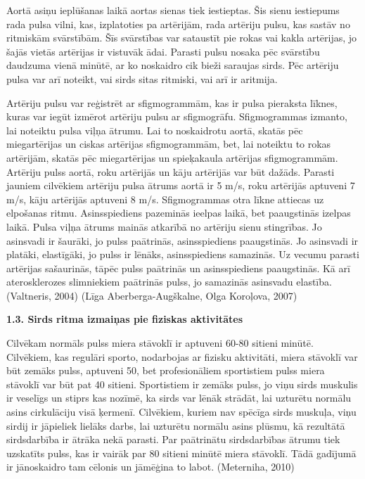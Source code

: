 \documentclass[12pt]{article}
\begin{document}
Aortā asiņu ieplūšanas laikā aortas sienas tiek iestieptas. Šis sienu iestiepums rada pulsa vilni, kas, izplatoties pa artērijām, rada artēriju pulsu, kas sastāv no ritmiskām svārstībām. Šīs svārstības var sataustīt pie rokas vai kakla artērijas, jo šajās vietās artērijas ir vistuvāk ādai. Parasti pulsu nosaka pēc svārstību daudzuma vienā minūtē, ar ko noskaidro cik bieži saraujas sirds. Pēc artēriju pulsa var arī noteikt, vai sirds sitas ritmiski, vai arī ir aritmija. \par
Artēriju pulsu var reģistrēt ar sfigmogrammām, kas ir pulsa pieraksta līknes, kuras  var iegūt izmērot artēriju pulsu ar sfigmogrāfu. Sfigmogrammas izmanto, lai noteiktu pulsa viļņa ātrumu. Lai to noskaidrotu aortā, skatās pēc miegartērijas un ciskas artērijas sfigmogrammām, bet, lai noteiktu to rokas artērijām, skatās pēc miegartērijas un spieķakaula artērijas sfigmogrammām. Artēriju pulss aortā, roku artērijās un kāju artērijās var būt dažāds. Parasti jauniem cilvēkiem artēriju pulsa ātrums aortā ir 5 m/s, roku artērijās aptuveni 7 m/s, kāju artērijās aptuveni 8 m/s. Sfigmogrammas otra līkne attiecas uz elpošanas ritmu. Asinsspiediens pazeminās ieelpas laikā, bet paaugstinās izelpas laikā. Pulsa viļņa ātrums mainās atkarībā no artēriju sienu stingrības. Jo asinsvadi ir šaurāki, jo pulss paātrinās, asinsspiediens paaugstinās. Jo asinsvadi ir platāki, elastīgāki, jo pulss ir lēnāks, asinsspiediens samazinās. Uz vecumu parasti artērijas sašaurinās, tāpēc pulss paātrinās un asinsspiediens paaugstinās. Kā arī aterosklerozes slimniekiem paātrinās pulss, jo samazinās asinsvadu elastība. 
(Valtneris, 2004) (Līga Aberberga-Augškalne, Olga Koroļova, 2007)



\begin{center}
\fontsize{14}{}\selectfont\textbf{1.3. Sirds ritma izmaiņas pie fiziskas aktivitātes}
\end{center}

Cilvēkam normāls pulss miera stāvoklī ir aptuveni 60-80 sitieni minūtē. Cilvēkiem, kas regulāri sporto, nodarbojas ar fizisku aktivitāti, miera stāvoklī var būt zemāks pulss, aptuveni 50, bet profesionāliem sportistiem pulss miera stāvoklī var būt pat 40 sitieni. Sportistiem ir zemāks pulss, jo viņu sirds muskulis ir veselīgs un stiprs kas nozīmē, ka sirds var lēnāk strādāt, lai uzturētu normālu asins cirkulāciju visā ķermenī. Cilvēkiem, kuriem nav spēcīga sirds muskuļa, viņu sirdij ir jāpieliek lielāks darbs, lai uzturētu normālu asins plūsmu, kā rezultātā sirdsdarbība ir ātrāka nekā parasti. Par paātrinātu sirdsdarbības ātrumu tiek uzskatīts pulss, kas ir vairāk par 80 sitieni minūtē miera stāvoklī. Tādā gadījumā ir jānoskaidro tam cēlonis un jāmēģina to labot. (Meterniha, 2010)
\end{document}
